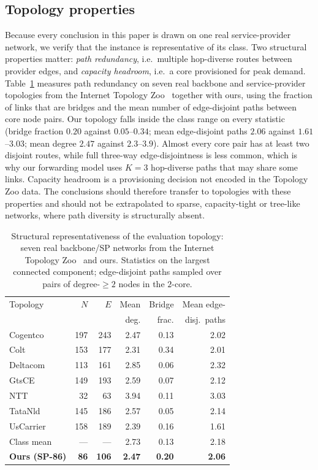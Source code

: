\documentclass[10pt,journal,comsoc]{IEEEtran}
\begin{document}
\subsection{Topology properties}
\label{subsec:topology-scope}
Because every conclusion in this paper is drawn on one real service-provider network, we verify that the instance is representative of its class. Two structural properties matter: \emph{path redundancy}, i.e.\ multiple hop-diverse routes between provider edges, and \emph{capacity headroom}, i.e.\ a core provisioned for peak demand. Table~\ref{tab:topo-zoo} measures path redundancy on seven real backbone and service-provider topologies from the Internet Topology Zoo~\cite{knight2011internet} together with ours, using the fraction of links that are bridges and the mean number of edge-disjoint paths between core node pairs. Our topology falls inside the class range on every statistic (bridge fraction $0.20$ against $0.05$--$0.34$; mean edge-disjoint paths $2.06$ against $1.61$--$3.03$; mean degree $2.47$ against $2.3$--$3.9$). Almost every core pair has at least two disjoint routes, while full three-way edge-disjointness is less common, which is why our forwarding model uses $K{=}3$ hop-diverse paths that may share some links. Capacity headroom is a provisioning decision not encoded in the Topology Zoo data. The conclusions should therefore transfer to topologies with these properties and should not be extrapolated to sparse, capacity-tight or tree-like networks, where path diversity is structurally absent.

\begin{table}[!t]
  \centering
  \caption{Structural representativeness of the evaluation topology: seven real backbone/SP networks from the Internet Topology Zoo~\cite{knight2011internet} and ours. Statistics on the largest connected component; edge-disjoint paths sampled over pairs of degree-$\geq2$ nodes in the $2$-core.}
  \label{tab:topo-zoo}
  \small
  \begin{tabular}{lrrrrr}
    \toprule
    Topology & $N$ & $E$ & Mean & Bridge & Mean edge- \\
             &     &     & deg. & frac. & disj.\ paths \\
    \midrule
    Cogentco   & 197 & 243 & 2.47 & 0.13 & 2.02 \\
    Colt       & 153 & 177 & 2.31 & 0.34 & 2.01 \\
    Deltacom   & 113 & 161 & 2.85 & 0.06 & 2.32 \\
    GtsCE      & 149 & 193 & 2.59 & 0.07 & 2.12 \\
    NTT        &  32 &  63 & 3.94 & 0.11 & 3.03 \\
    TataNld    & 145 & 186 & 2.57 & 0.05 & 2.14 \\
    UsCarrier  & 158 & 189 & 2.39 & 0.16 & 1.61 \\
    \midrule
    Class mean & --- & --- & 2.73 & 0.13 & 2.18 \\
    \textbf{Ours (SP-86)} & \textbf{86} & \textbf{106} & \textbf{2.47} & \textbf{0.20} & \textbf{2.06} \\
    \bottomrule
  \end{tabular}
\end{table}
\end{document}
